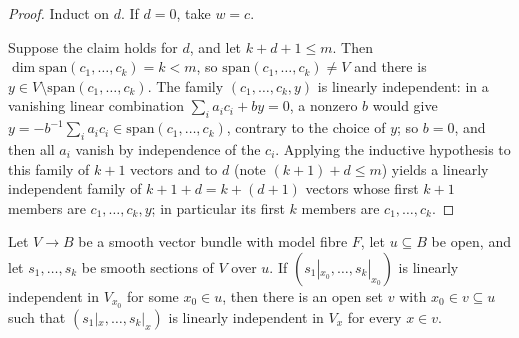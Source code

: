 \begin{proof}
\leanok
Induct on $d$. If $d = 0$, take $w = c$.

Suppose the claim holds for $d$, and let $k + d + 1 \leq m$. Then $\dim \mathrm{span}(c_1, \ldots, c_k) = k < m$, so $\mathrm{span}(c_1, \ldots, c_k) \neq V$ and there is $y \in V \setminus \mathrm{span}(c_1, \ldots, c_k)$. The family $(c_1, \ldots, c_k, y)$ is linearly independent: in a vanishing linear combination $\sum_i a_i c_i + b y = 0$, a nonzero $b$ would give $y = -b^{-1}\sum_i a_i c_i \in \mathrm{span}(c_1,\ldots,c_k)$, contrary to the choice of $y$; so $b = 0$, and then all $a_i$ vanish by independence of the $c_i$. Applying the inductive hypothesis to this family of $k+1$ vectors and to $d$ (note $(k+1) + d \le m$) yields a linearly independent family of $k + 1 + d = k + (d+1)$ vectors whose first $k+1$ members are $c_1, \ldots, c_k, y$; in particular its first $k$ members are $c_1, \ldots, c_k$.
\end{proof}

\begin{lemma}
\label{lem:open-linear-independence}
\leanok
Let $V \to B$ be a smooth vector bundle with model fibre $F$, let $u \subseteq B$ be open, and let $s_1, \ldots, s_k$ be smooth sections of $V$ over $u$. If $(s_1|_{x_0}, \ldots, s_k|_{x_0})$ is linearly independent in $V_{x_0}$ for some $x_0 \in u$, then there is an open set $v$ with $x_0 \in v \subseteq u$ such that $(s_1|_x, \ldots, s_k|_x)$ is linearly independent in $V_x$ for every $x \in v$.
\end{lemma}


